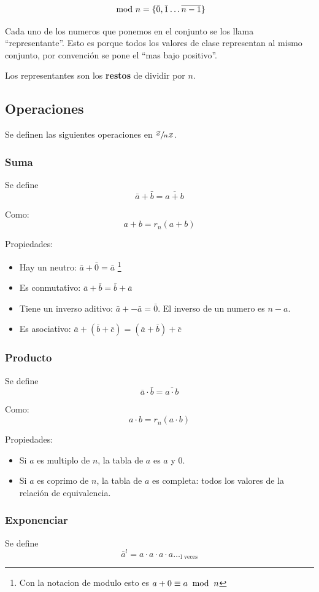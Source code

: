 \documentclass[12pt,a4paper]{report}
\begin{document}
$$
\; \bmod \; {{n}}  = \{ \bar 0, \bar 1 \dots \overline{n-1} \}
$$

Cada uno de los numeros que ponemos en el conjunto se los llama ``representante''. Esto es porque todos los valores de clase representan al mismo conjunto, por convención se pone el ``mas bajo positivo''.


Los representantes son los \textbf{restos} de dividir por $n$.

\subsection{Operaciones}
Se definen las siguientes operaciones en $\sfrac{\mathcal{{Z}}}{n \mathcal{{Z}}}$.
\subsubsection{Suma}
Se define
$$\bar a + \bar b = \overline{a + b}$$

Como:
$$
a + b = r_n(a+b)
$$

Propiedades:
\begin{itemize}
    \item{Hay un neutro: $\bar a + \bar 0 = \bar a$ \footnote{Con la notacion de modulo esto es $a + 0 \equiv a \; \bmod \; {{n}}$}}
    \item{Es conmutativo: $\bar a + \bar b = \bar b + \bar a$}
    \item{Tiene un inverso aditivo: $\bar a + - \bar a = \bar 0$. El inverso de un numero es $n-a$.}
    \item{Es asociativo: $\bar a + (\bar b + \bar c) = (\bar a + \bar b) + \bar c$}
\end{itemize}

\subsubsection{Producto}
Se define
$$\bar a \cdot \bar b = \overline{a \cdot b}$$

Como:
$$
a \cdot b = r_n(a \cdot b)
$$

Propiedades:
\begin{itemize}
  \item{Si $a$ es multiplo de $n$, la tabla de $a$ es $a$ y $0$.}
  \item{Si $a$ es coprimo de $n$, la tabla de $a$ es completa: todos los valores de la relación de equivalencia.}
\end{itemize}

\subsubsection{Exponenciar}
Se define
$$\bar a^l = a \cdot a \cdot a \cdot a \dots_{\text{l veces}} $$
\end{document}
